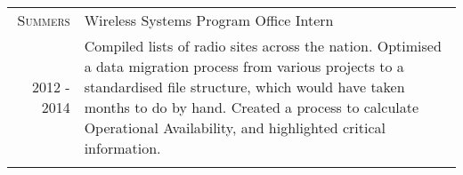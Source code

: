 \documentclass[letterpaper,10pt]{article}
\begin{document}
\begin{tabular}{R|p{6.2in}}
	\textsc{Summers}               & Wireless Systems Program Office Intern                                                                                                                                                                                                                                                                                                                                                                                                                                                                                                                                                                                                                                                                                                                                                                                                                                                                                                                                                                                                                                                                                                                                                                                                            \\
	2012 - 2014                    & \footnotesize Compiled lists of radio sites across the nation. Optimised a data migration process from various projects to a standardised file structure, which would have taken months to do by hand. Created a process to calculate Operational Availability, and highlighted critical information.                                                                                                                                                                                                                                                                                                                                                                                                                                                                                                                                                                                                                                                                                                                                                                                                                                                                                                                                             \\\\


\end{tabular}
\end{document}
